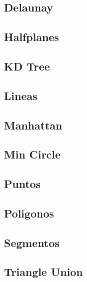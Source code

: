 \subsection{Delaunay}
\raggedbottom
\hrulefill
\subsection{Halfplanes}
\raggedbottom
\hrulefill
\subsection{KD Tree}
\raggedbottom
\hrulefill
\subsection{Lineas}
\raggedbottom
\hrulefill
\subsection{Manhattan}
\raggedbottom
\hrulefill
\subsection{Min Circle}
\raggedbottom
\hrulefill
\subsection{Puntos}
\raggedbottom
\hrulefill
\subsection{Poligonos}
\raggedbottom
\hrulefill
\subsection{Segmentos}
\raggedbottom
\hrulefill
\subsection{Triangle Union}
\raggedbottom
\hrulefill

